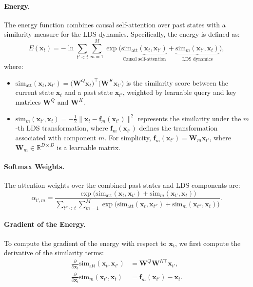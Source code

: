 \documentclass{article}
\begin{document}
\paragraph{Energy.}
The energy function combines causal self-attention over past states with a similarity measure for the LDS dynamics. Specifically, the energy is defined as:
\[
E(\bm{x}_t) = -\ln \sum_{t' < t} \sum_{m=1}^M \exp \Big( \underbrace{\mathrm{sim}_{\text{att}}(\bm{x}_t, \bm{x}_{t'})}_{\text{Causal self-attention}} + \underbrace{\mathrm{sim}_m(\bm{x}_{t'}, \bm{x}_t)}_{\text{LDS dynamics}} \Big),
\]
where:
\begin{itemize}
    \item \(\mathrm{sim}_{\text{att}}(\bm{x}_t, \bm{x}_{t'}) = \big(\bm{W}^Q \bm{x}_t\big)^\top \big(\bm{W}^K \bm{x}_{t'}\big)\) is the similarity score between the current state \(\bm{x}_t\) and a past state \(\bm{x}_{t'}\), weighted by learnable query and key matrices \(\bm{W}^Q\) and \(\bm{W}^K\).
    \item \(\mathrm{sim}_m(\bm{x}_{t'}, \bm{x}_t) = -\frac{1}{2} \|\bm{x}_t - \bm{f}_m(\bm{x}_{t'})\|^2\) represents the similarity under the \(m\)-th LDS transformation, where \(\bm{f}_m(\bm{x}_{t'})\) defines the transformation associated with component \(m\). For simplicity, \(\bm{f}_m(\bm{x}_{t'}) = \bm{W}_m \bm{x}_{t'}\), where \(\bm{W}_m \in \mathbb{R}^{D \times D}\) is a learnable matrix.
\end{itemize}

\paragraph{Softmax Weights.}
The attention weights over the combined past states and LDS components are:
\[
\alpha_{t',m} = \frac{\exp \Big( \mathrm{sim}_{\text{att}}(\bm{x}_t, \bm{x}_{t'}) + \mathrm{sim}_m(\bm{x}_{t'}, \bm{x}_t) \Big)}{\sum_{t'' < t} \sum_{m=1}^M \exp \Big( \mathrm{sim}_{\text{att}}(\bm{x}_t, \bm{x}_{t''}) + \mathrm{sim}_m(\bm{x}_{t''}, \bm{x}_t) \Big)}.
\]

\paragraph{Gradient of the Energy.}
To compute the gradient of the energy with respect to \(\bm{x}_t\), we first compute the derivative of the similarity terms:
\begin{align*}
\frac{\partial}{\partial \bm{x}_t} \mathrm{sim}_{\text{att}}(\bm{x}_t, \bm{x}_{t'}) &= \bm{W}^Q \bm{W}^{K\top} \bm{x}_{t'}, \\
\frac{\partial}{\partial \bm{x}_t} \mathrm{sim}_m(\bm{x}_{t'}, \bm{x}_t) &= \bm{f}_m(\bm{x}_{t'}) - \bm{x}_t.
\end{align*}
\end{document}

